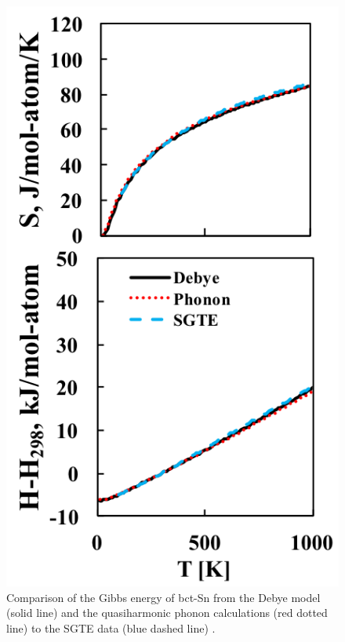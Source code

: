 \pagebreak
\begin{figure}[H]
	\centering
	\includegraphics[scale=1.0]{Chapter-4/Figures/Snfinitetemp.png}
	\caption{Comparison of the Gibbs energy of bct-Sn from the Debye model (solid line) and the quasiharmonic phonon calculations (red dotted line) to the SGTE data (blue dashed line) \cite{Dinsdale1991}.}
	\label{Ch4-figure:Snfinitetemp}
\end{figure}

